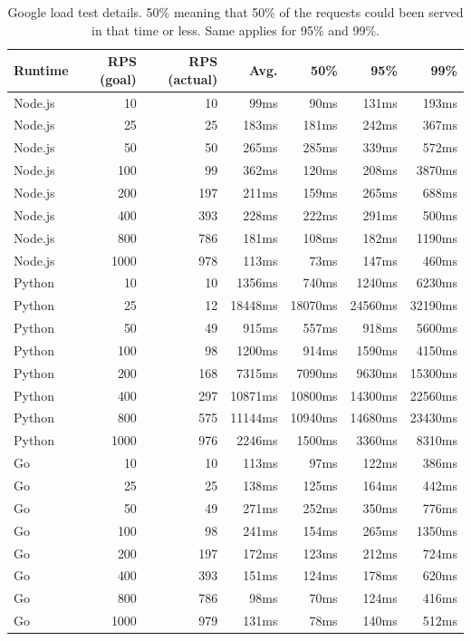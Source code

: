 \newpage
\begin{table}[h]
    \centering
    \begin{tabular}{|l|r|r|r|r|r|r|} \hline
    \textbf{Runtime} & \textbf{RPS (goal)} & \textbf{RPS (actual)} & \textbf{Avg.} & \textbf{50\%} & \textbf{95\%} & \textbf{99\%} \\ \hline
Node.js	&	10	&	10	&	99ms	&	90ms	&	131ms	&	193ms	\\ \hline
Node.js	&	25	&	25	&	183ms	&	181ms	&	242ms	&	367ms	\\ \hline
Node.js	&	50	&	50	&	265ms	&	285ms	&	339ms	&	572ms	\\ \hline
Node.js	&	100	&	99	&	362ms	&	120ms	&	208ms	&	3870ms	\\ \hline
Node.js	&	200	&	197	&	211ms	&	159ms	&	265ms	&	688ms	\\ \hline
Node.js	&	400	&	393	&	228ms	&	222ms	&	291ms	&	500ms	\\ \hline
Node.js	&	800	&	786	&	181ms	&	108ms	&	182ms	&	1190ms	\\ \hline
Node.js	&	1000	&	978	&	113ms	&	73ms	&	147ms	&	460ms	\\ \hline
Python	&	10	&	10	&	1356ms	&	740ms	&	1240ms	&	6230ms	\\ \hline
Python	&	25	&	12	&	18448ms	&	18070ms	&	24560ms	&	32190ms	\\ \hline
Python	&	50	&	49	&	915ms	&	557ms	&	918ms	&	5600ms	\\ \hline
Python	&	100	&	98	&	1200ms	&	914ms	&	1590ms	&	4150ms	\\ \hline
Python	&	200	&	168	&	7315ms	&	7090ms	&	9630ms	&	15300ms	\\ \hline
Python	&	400	&	297	&	10871ms	&	10800ms	&	14300ms	&	22560ms	\\ \hline
Python	&	800	&	575	&	11144ms	&	10940ms	&	14680ms	&	23430ms	\\ \hline
Python	&	1000	&	976	&	2246ms	&	1500ms	&	3360ms	&	8310ms	\\ \hline
Go	&	10	&	10	&	113ms	&	97ms	&	122ms	&	386ms	\\ \hline
Go	&	25	&	25	&	138ms	&	125ms	&	164ms	&	442ms	\\ \hline
Go	&	50	&	49	&	271ms	&	252ms	&	350ms	&	776ms	\\ \hline
Go	&	100	&	98	&	241ms	&	154ms	&	265ms	&	1350ms	\\ \hline
Go	&	200	&	197	&	172ms	&	123ms	&	212ms	&	724ms	\\ \hline
Go	&	400	&	393	&	151ms	&	124ms	&	178ms	&	620ms	\\ \hline
Go	&	800	&	786	&	98ms	&	70ms	&	124ms	&	416ms	\\ \hline
Go	&	1000	&	979	&	131ms	&	78ms	&	140ms	&	512ms	\\ \hline
    \end{tabular}
    \caption[Google load test details]{Google load test details. 50\% meaning that 50\% of the requests could been served in that time or less. Same applies for 95\% and 99\%.}
    \label{table:google_load_test}
\end{table}


